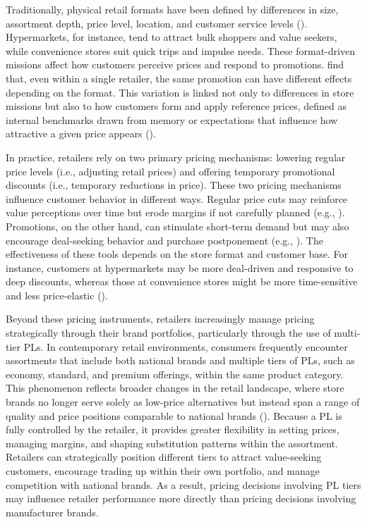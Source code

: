 Traditionally, physical retail formats have been defined by differences in size, assortment depth, price level, location, and customer service levels (\cite{Bonfrer2022-tb}). Hypermarkets, for instance, tend to attract bulk shoppers and value seekers, while convenience stores suit quick trips and impulse needs. These format-driven missions affect how customers perceive prices and respond to promotions. \textcite{Haans2011-cv} find that, even within a single retailer, the same promotion can have different effects depending on the format. This variation is linked not only to differences in store missions but also to how customers form and apply reference prices, defined as internal benchmarks drawn from memory or expectations that influence how attractive a given price appears (\cite{Mazumdar2005-ny, Van_Oest2013-ty}).

In practice, retailers rely on two primary pricing mechanisms: lowering regular price levels (i.e., adjusting retail prices) and offering temporary promotional discounts (i.e., temporary reductions in price). These two pricing mechanisms influence customer behavior in different ways. Regular price cuts may reinforce value perceptions over time but erode margins if not carefully planned (e.g., \cite{Lalwani2005-pn,Zeithaml1988-dp}). Promotions, on the other hand, can stimulate short-term demand but may also encourage deal-seeking behavior and purchase postponement (e.g., \cite{Hamilton2013-ok}). The effectiveness of these tools depends on the store format and customer base. For instance, customers at hypermarkets may be more deal-driven and responsive to deep discounts, whereas those at convenience stores might be more time-sensitive and less price-elastic (\cite{Ailawadi2008-zy, Weathers2015-an}).

Beyond these pricing instruments, retailers increasingly manage pricing strategically through their brand portfolios, particularly through the use of multi-tier PLs. In contemporary retail environments, consumers frequently encounter assortments that include both national brands and multiple tiers of PLs, such as economy, standard, and premium offerings, within the same product category. This phenomenon reflects broader changes in the retail landscape, where store brands no longer serve solely as low-price alternatives but instead span a range of quality and price positions comparable to national brands (\cite{Keller2026-wu}). Because a PL is fully controlled by the retailer, it provides greater flexibility in setting prices, managing margins, and shaping substitution patterns within the assortment. Retailers can strategically position different tiers to attract value-seeking customers, encourage trading up within their own portfolio, and manage competition with national brands. As a result, pricing decisions involving PL tiers may influence retailer performance more directly than pricing decisions involving manufacturer brands.

